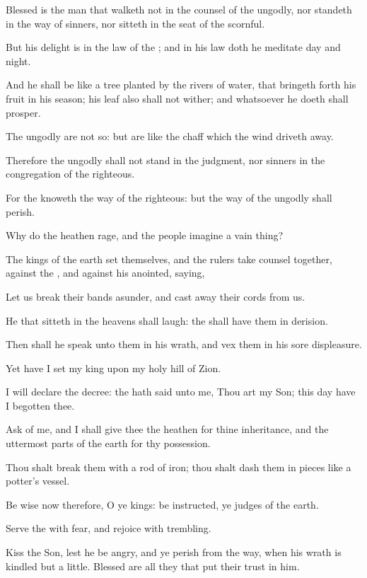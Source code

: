 \Chapter
\Verse Blessed is the man that walketh not in the counsel of the ungodly, nor standeth in the way of sinners, nor sitteth in the seat of the scornful.

\Verse But his delight is in the law of the \LORD; and in his law doth he meditate day and night.

\Verse And he shall be like a tree planted by the rivers of water, that bringeth forth his fruit in his season; his leaf also shall not wither; and whatsoever he doeth shall prosper.

\Verse The ungodly are not so: but are like the chaff which the wind driveth away.

\Verse Therefore the ungodly shall not stand in the judgment, nor sinners in the congregation of the righteous.

\Verse For the \LORD knoweth the way of the righteous: but the way of the ungodly shall perish.




\Chapter
\Verse Why do the heathen rage, and the people imagine a vain thing?

\Verse The kings of the earth set themselves, and the rulers take counsel together, against the \LORD, and against his anointed, saying,

\Verse Let us break their bands asunder, and cast away their cords from us.

\Verse He that sitteth in the heavens shall laugh: the \LORD shall have them in derision.

\Verse Then shall he speak unto them in his wrath, and vex them in his sore displeasure.

\Verse Yet have I set my king upon my holy hill of Zion.

\Verse I will declare the decree: the \LORD hath said unto me, Thou art my Son; this day have I begotten thee.

\Verse Ask of me, and I shall give thee the heathen for thine inheritance, and the uttermost parts of the earth for thy possession.

\Verse Thou shalt break them with a rod of iron; thou shalt dash them in pieces like a potter's vessel.

\Verse Be wise now therefore, O ye kings: be instructed, ye judges of the earth.

\Verse Serve the \LORD with fear, and rejoice with trembling.

\Verse Kiss the Son, lest he be angry, and ye perish from the way, when his wrath is kindled but a little. Blessed are all they that put their trust in him.




